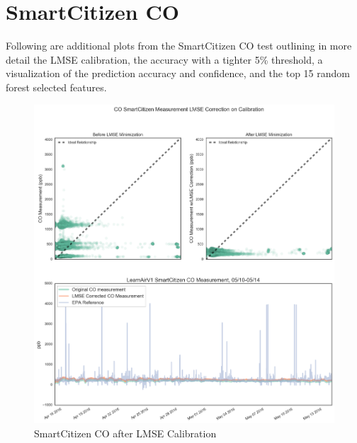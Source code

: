 \pagebreak

\FloatBarrier
\section{SmartCitizen CO}
\FloatBarrier

Following are additional plots from the SmartCitizen CO test outlining in more detail the LMSE calibration, the accuracy with a tighter 5\% threshold, a visualization of the prediction accuracy and confidence, and the top 15 random forest selected features.

\begin{figure}[htb]
 	\includegraphics[width=\textwidth]{figs/sck_co_lmse}               
 	 \caption{SmartCitizen CO after LMSE Calibration}
  	\label{fig:sck_co_lmse}
\end{figure}

